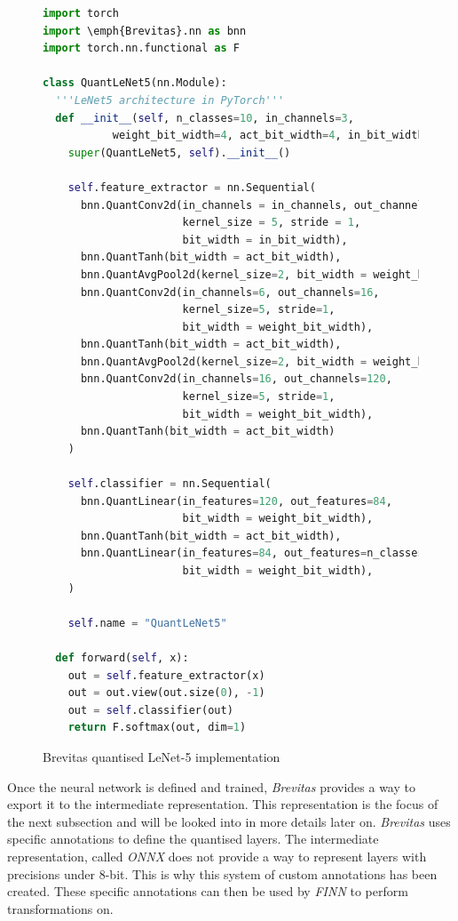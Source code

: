 \begin{figure}[htbp]
\centering
\begin{lstlisting}[language=Python]
import torch
import \emph{Brevitas}.nn as bnn
import torch.nn.functional as F

class QuantLeNet5(nn.Module):
  '''LeNet5 architecture in PyTorch'''
  def __init__(self, n_classes=10, in_channels=3,
           weight_bit_width=4, act_bit_width=4, in_bit_width=8):
    super(QuantLeNet5, self).__init__()

    self.feature_extractor = nn.Sequential(
      bnn.QuantConv2d(in_channels = in_channels, out_channels = 6,
                      kernel_size = 5, stride = 1,
                      bit_width = in_bit_width),
      bnn.QuantTanh(bit_width = act_bit_width),
      bnn.QuantAvgPool2d(kernel_size=2, bit_width = weight_bit_width),
      bnn.QuantConv2d(in_channels=6, out_channels=16,
                      kernel_size=5, stride=1,
                      bit_width = weight_bit_width),
      bnn.QuantTanh(bit_width = act_bit_width),
      bnn.QuantAvgPool2d(kernel_size=2, bit_width = weight_bit_width),
      bnn.QuantConv2d(in_channels=16, out_channels=120,
                      kernel_size=5, stride=1,
                      bit_width = weight_bit_width),
      bnn.QuantTanh(bit_width = act_bit_width)
    )

    self.classifier = nn.Sequential(
      bnn.QuantLinear(in_features=120, out_features=84,
                      bit_width = weight_bit_width),
      bnn.QuantTanh(bit_width = act_bit_width),
      bnn.QuantLinear(in_features=84, out_features=n_classes,
                      bit_width = weight_bit_width),
    )

    self.name = "QuantLeNet5"

  def forward(self, x):
    out = self.feature_extractor(x)
    out = out.view(out.size(0), -1)
    out = self.classifier(out)
    return F.softmax(out, dim=1)
\end{lstlisting}
\caption[LeNetBrevitas]{Brevitas quantised LeNet-5 \cite{LeCun1998} implementation}
	\label{fig:LeNetBrevitas}
\end{figure}

Once the neural network is defined and trained, \emph{Brevitas} provides a way to export it to the intermediate representation. This representation is the focus of the next subsection and will be looked into in more details later on. \emph{Brevitas} uses specific annotations to define the quantised layers.  The intermediate representation, called \emph{ONNX} does not provide a way to represent layers with precisions under 8-bit. This is why this system of custom annotations has been created. These specific annotations can then be used by \emph{FINN} to perform transformations on.

